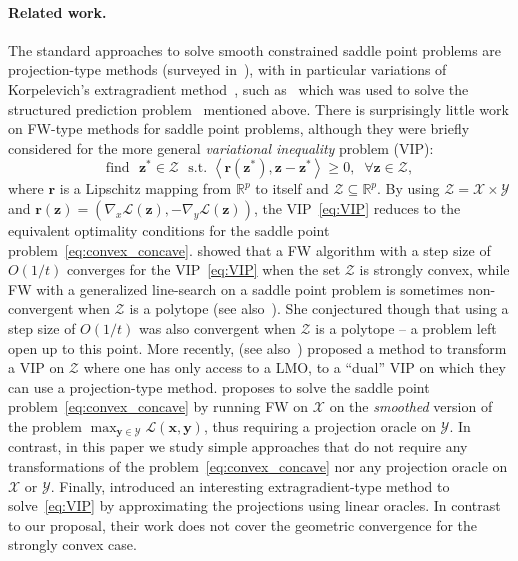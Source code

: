 \documentclass[twoside]{article}
\newcommand{\R}{\mathbb{R}}
\renewcommand{\L}{\mathcal{L}}
\newcommand{\X}{\mathcal{X}}
\newcommand{\Y}{\mathcal{Y}}
\newcommand{\Z}{\mathcal{Z}}
\newcommand{\x}{\bm{x}}
\newcommand{\y}{\bm{y}}
\newcommand{\z}{\bm{z}}
\newcommand{\FF}{\r} %
\renewcommand{\r}{\bm{r}}
\newcommand{\innerProd}[2]{\left\langle #1 , #2 \right\rangle}
\newcommand{\0}{\mathbf{0}} %
\begin{document}
\paragraph{Related work.}
The standard approaches to solve smooth constrained saddle point problems are projection-type methods (surveyed in~\citet{xiu2003surveyVIP}), with in particular variations of Korpelevich's extragradient method~\citep{korpelevich1976extragradient}, such as~\citep{nesterov2007dualExtrag} which was used to solve the structured prediction problem~\citep{taskar2006dualExtrag} mentioned above.
There is surprisingly little work on FW-type methods for saddle point problems, although they were briefly considered for the more general \emph{variational inequality} problem (VIP):
\vspace{-0.5mm}
\begin{equation} \label{eq:VIP}
\text{find } \,\, \z^* \in \Z \,\, \text{ s.t.} \,\, \innerProd{\FF(\z^*)}{\z - \z^*} \geq 0, \;\; \forall \z \in \Z,
\end{equation}
where $\FF$ is a Lipschitz mapping from $\R^p$ to itself and $\Z \subseteq \R^p$. By using $\Z = \X \times \Y$ and $\FF(\z) = (\nabla_x \L(\z),-\nabla_y \L(\z))$, the VIP~\eqref{eq:VIP} reduces to the equivalent optimality conditions for the saddle point problem~\eqref{eq:convex_concave}. 
\citet{hammond1984solving} showed that a FW algorithm with a step size of $O(1/t)$ converges for the VIP~\eqref{eq:VIP} when the set $\Z$ is strongly convex,
while FW with a generalized line-search on a saddle point problem is sometimes non-convergent when $\Z$ is a polytope (see also~\citep[\S~3.1.1]{patriksson1999nonlinear}). 
She conjectured though that using a step size of $O(1/t)$ was also convergent when $\Z$ is a polytope -- a problem left open up to this point. 
More recently, \citet{juditsky2016VIP} (see also~\citet{cox2015decompositionLMO}) proposed a method to transform a VIP on $\Z$ where one has only access to a LMO, to a ``dual'' VIP on which they can use a projection-type method. 
\citet{lan2013FW} proposes to solve the saddle point problem~\eqref{eq:convex_concave} by running FW on $\X$ on the \emph{smoothed} version of the problem $\max_{\y \in \Y} \L(\x,\y)$, thus requiring a projection oracle on $\Y$. 
In contrast, in this paper we study simple approaches that do not require any transformations of the problem~\eqref{eq:convex_concave} nor any projection oracle on $\X$ or $\Y$. Finally, \citet{he2015semi} introduced an interesting extragradient-type method to solve~\eqref{eq:VIP} by approximating the projections using linear oracles. In contrast to our proposal, their work does not cover the geometric convergence for the strongly convex case.
\end{document}
